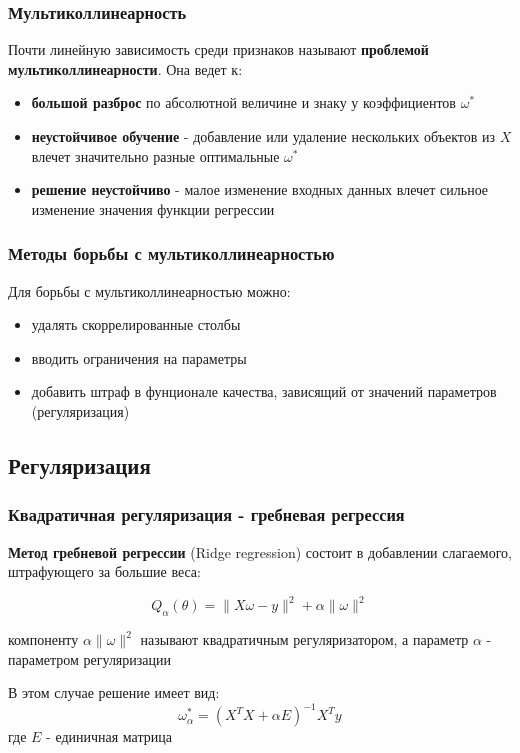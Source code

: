 \documentclass{beamer}
\begin{document}
	
	\begin{frame}
		\frametitle{Мультиколлинеарность}
		Почти линейную зависимость среди признаков называют \textbf{проблемой мультиколлинеарности}. Она ведет к:
		
		\vspace{5pt}
		
		\begin{itemize}
			\item \textbf{большой разброс} по абсолютной величине и знаку у коэффициентов $\omega^{*}$
			
			\item \textbf{неустойчивое обучение} - добавление или удаление нескольких объектов из $X$ влечет значительно разные оптимальные $\omega^{*}$
			
			\item \textbf{решение неустойчиво} - малое изменение входных данных влечет сильное изменение значения функции регрессии
		\end{itemize}
	\end{frame}
	
	\begin{frame}
		\frametitle{Методы борьбы с мультиколлинеарностью} 
		Для борьбы с мультиколлинеарностью можно:
		\begin{itemize}
			\item удалять скоррелированные столбы 
			\item вводить ограничения на параметры
			\item добавить штраф  в фунционале качества, зависящий от значений параметров (регуляризация)
		\end{itemize}
	\end{frame}
	
	
	\subsection{Регуляризация}
	
	
	\begin{frame}
		\frametitle{Квадратичная регуляризация - гребневая регрессия}
		\textbf{Метод гребневой регрессии} (Ridge regression) состоит в добавлении слагаемого, штрафующего за большие веса:
		
		$$Q_{\alpha}(\theta) = \|X\omega - y\|^{2} + \alpha \|\omega\|^{2}$$
		
		компоненту $\alpha \|\omega\|^{2}$ называют квадратичным регуляризатором, а параметр $\alpha$ - параметром регуляризации
		
		\vspace{15pt}
		
		В этом случае решение имеет вид:
		$$
		\omega_{\alpha}^{*} = (X^{T}X + \alpha E)^{-1} X^{T} y
		$$
		где $E$ - единичная матрица
	\end{frame}
	
\end{document}
